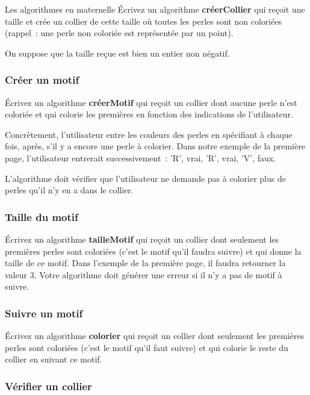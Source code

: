 \begin{Exercice}{Les algorithmes en maternelle}
			Écrivez un algorithme \textbf{créerCollier}
			qui reçoit une taille et crée un collier de cette taille
			où toutes les perles sont non coloriées
			(rappel~: une perle non coloriée est représentée par un point).
			
			On suppose que la taille reçue est bien un entier non négatif.
	
		\subsubsection*{Créer un motif}
		
			Écrivez un algorithme \textbf{créerMotif}
			qui reçoit un collier dont aucune perle n’est coloriée
			et qui colorie les premières en fonction des indications
			de l’utilisateur.
			
			Concrètement,
			l’utilisateur entre les couleurs des perles
			en spécifiant à chaque fois, après,
			s’il y a encore une perle à colorier.
			Dans notre exemple de la première page,
			l’utilisateur entrerait successivement~:
			'R', vrai, 'R', vrai, 'V', faux. 
			
			L’algorithme doit vérifier que l’utilisateur
			ne demande pas à colorier plus de perles
			qu’il n’y en a dans le collier.
	
		\subsubsection*{Taille du motif}
	
			Écrivez un algorithme \textbf{tailleMotif}
			qui reçoit un collier dont seulement les premières perles sont coloriées
			(c’est le motif qu’il faudra suivre)
			et qui donne la taille de ce motif.
			Dans l’exemple de la première page, il faudra retourner la valeur 3.
			Votre algorithme doit générer une erreur si il n’y a pas de motif à suivre.
	
		\subsubsection*{Suivre un motif}
		
			Écrivez un algorithme \textbf{colorier}
			qui reçoit un collier dont seulement les premières perles sont coloriées
			(c’est le motif qu’il faut suivre)
			et qui colorie le reste du collier en suivant ce motif.
			
		\subsubsection*{Vérifier un collier}
		

\end{Exercice}
